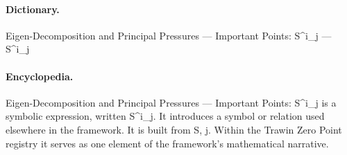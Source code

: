 \paragraph{Dictionary.}
Eigen-Decomposition and Principal Pressures — Important Points: S\textasciicircum{}i\_j — S\textasciicircum{}i\_j

\paragraph{Encyclopedia.}
Eigen-Decomposition and Principal Pressures — Important Points: S\textasciicircum{}i\_j is a symbolic expression, written S\textasciicircum{}i\_j. It introduces a symbol or relation used elsewhere in the framework. It is built from S, j. Within the Trawin Zero Point registry it serves as one element of the framework's mathematical narrative.
